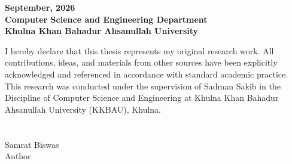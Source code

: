 \begin{center}
\large
\textbf{September, 2026}\\
\textbf{Computer Science and Engineering Department}\\
\textbf{Khulna Khan Bahadur Ahsanullah University}\\

\end{center}


I hereby declare that this thesis represents my original research work. All contributions, ideas, and materials from other sources have been explicitly acknowledged and referenced in accordance with standard academic practice. This research was conducted under the supervision of Sadman Sakib in the Discipline of Computer Science and Engineering at Khulna Khan Bahadur Ahsanullah University (KKBAU), Khulna.\\ 
\vspace{72pt}\\
\hspace{0.5cm} \makebox[2in]{\hrulefill}\\ Samrat Biswas\\ Author\\ \vspace{24pt}\\